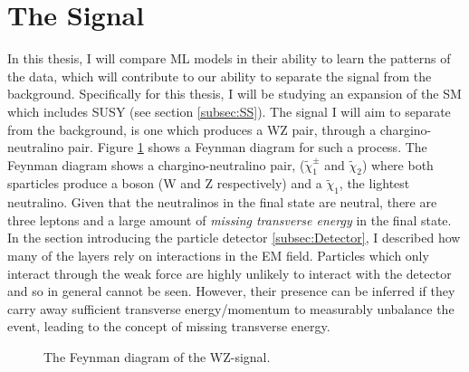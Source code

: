 \section{The Signal}\label{sec:signal}
In this thesis, I will compare \ac{ML} models in their ability to learn the patterns of the data, which will contribute  
to our ability to separate the signal from the background. Specifically for this thesis, I will be studying an expansion of the 
\ac{SM} which includes \ac{SUSY} (see section \ref{subsec:SS}). The signal I will aim to separate from the background, is one 
which produces a WZ pair, through a chargino-neutralino pair. Figure \ref{fig:signal} shows a Feynman diagram for 
such a process. The Feynman diagram shows a chargino-neutralino pair, ($\tilde{\chi}_1^\pm$ and $\tilde{\chi}_2$)
where both sparticles produce a boson (W and Z respectively) and a $\tilde{\chi}_1$, the lightest neutralino. Given that the 
neutralinos in the final state are neutral, there are three leptons and a large amount of \emph{missing transverse energy} in the final state.
In the section introducing the particle detector \ref{subsec:Detector}, I described how many of the layers rely on interactions in 
the \ac{EM} field. Particles which only interact through the weak force are highly unlikely to interact with the detector and so in general cannot be seen. 
However, their presence can be inferred if they carry away sufficient transverse energy/momentum to measurably unbalance the event, leading to the concept of 
missing transverse energy.
\begin{figure}[H]
    \centering
    \caption{The Feynman diagram of the WZ-signal.}
    \label{fig:signal}
\end{figure}